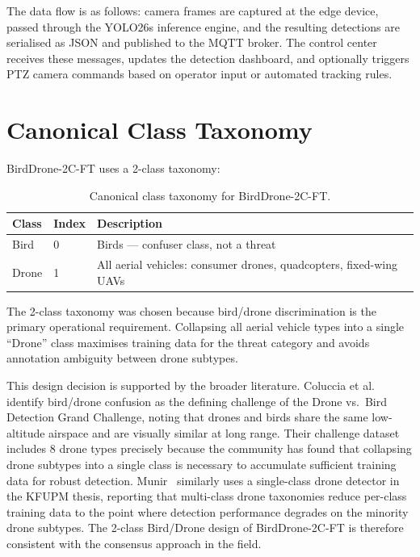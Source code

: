\documentclass[12pt,a4paper]{report}
\begin{document}
The data flow is as follows: camera frames are captured at the edge device,
passed through the YOLO26s inference engine, and the resulting detections
are serialised as JSON and published to the MQTT broker. The control center
receives these messages, updates the detection dashboard, and optionally
triggers PTZ camera commands based on operator input or automated tracking
rules.

\section{Canonical Class Taxonomy}

BirdDrone-2C-FT uses a 2-class taxonomy:

\begin{table}[H]
\centering
\caption{Canonical class taxonomy for BirdDrone-2C-FT.}
\begin{tabular}{|l|l|p{7cm}|}
\hline
\textbf{Class} & \textbf{Index} & \textbf{Description} \\
\hline
Bird  & 0 & Birds --- confuser class, not a threat \\
\hline
Drone & 1 & All aerial vehicles: consumer drones, quadcopters, fixed-wing UAVs \\
\hline
\end{tabular}
\end{table}

The 2-class taxonomy was chosen because bird/drone discrimination is the
primary operational requirement. Collapsing all aerial vehicle types into
a single ``Drone'' class maximises training data for the threat category
and avoids annotation ambiguity between drone subtypes.

This design decision is supported by the broader literature. Coluccia et al.~\cite{coluccia2021sensors}
identify bird/drone confusion as the defining challenge of the Drone vs.\ Bird
Detection Grand Challenge, noting that drones and birds share the same
low-altitude airspace and are visually similar at long range. Their challenge
dataset includes 8 drone types precisely because the community has found that
collapsing drone subtypes into a single class is necessary to accumulate
sufficient training data for robust detection. Munir~\cite{munir2023kfupm}
similarly uses a single-class drone detector in the KFUPM thesis, reporting
that multi-class drone taxonomies reduce per-class training data to the point
where detection performance degrades on the minority drone subtypes. The
2-class Bird/Drone design of BirdDrone-2C-FT is therefore consistent with
the consensus approach in the field.
\end{document}

